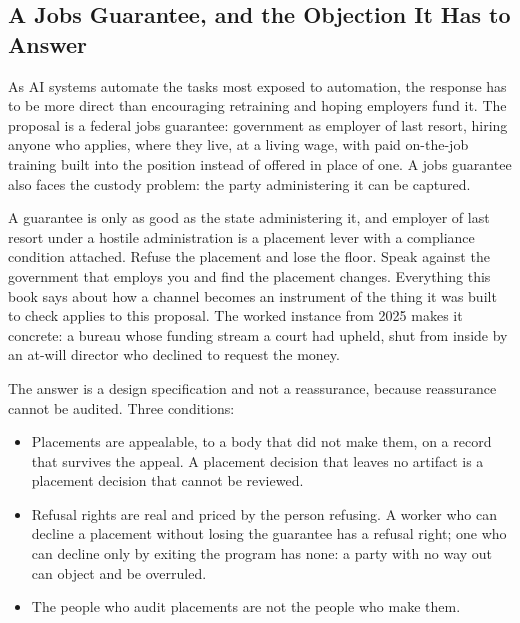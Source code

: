 \subsection{A Jobs Guarantee, and the Objection It Has to Answer}
\label{sec:guarantee-objection}
As AI systems automate the tasks most exposed to automation, the response has to be more direct than encouraging retraining and hoping employers fund it. The proposal is a federal jobs guarantee: government as employer of last resort, hiring anyone who applies, where they live, at a living wage, with paid on-the-job training built into the position instead of offered in place of one. A jobs guarantee also faces the custody problem: the party administering it can be captured.

A guarantee is only as good as the state administering it, and employer of last resort under a hostile administration is a placement lever with a compliance condition attached. Refuse the placement and lose the floor. Speak against the government that employs you and find the placement changes. Everything this book says about how a channel becomes an instrument of the thing it was built to check applies to this proposal. The worked instance from 2025 makes it concrete: a bureau whose funding stream a court had upheld, shut from inside by an at-will director who declined to request the money.

The answer is a design specification and not a reassurance, because reassurance cannot be audited. Three conditions:

\begin{itemize}
  \item Placements are appealable, to a body that did not make them, on a record that survives the appeal. A placement decision that leaves no artifact is a placement decision that cannot be reviewed.
  \item Refusal rights are real and priced by the person refusing. A worker who can decline a placement without losing the guarantee has a refusal right; one who can decline only by exiting the program has none: a party with no way out can object and be overruled.
  \item The people who audit placements are not the people who make them.
\end{itemize}

